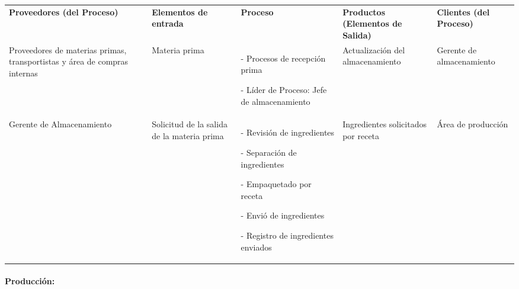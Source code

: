 \documentclass[11pt]{article}
\newcounter{none} %
\begin{document}
{\def\LTcaptype{none} %
\begin{longtable}[]{@{}
  >{\centering\arraybackslash}p{}
  >{\centering\arraybackslash}p{}
  >{\centering\arraybackslash}p{}
  >{\centering\arraybackslash}p{}
  >{\centering\arraybackslash}p{}@{}}
\toprule\noalign{}
\endhead
\bottomrule\noalign{}
\endlastfoot
\textbf{Proveedores (del Proceso)} & \textbf{Elementos de entrada} &
\textbf{Proceso} & \textbf{Productos (Elementos de Salida)} &
\textbf{Clientes (del Proceso)} \\
Proveedores de materias primas, transportistas y área de compras
internas & Materia prima & - Procesos de recepción prima

- Líder de Proceso: Jefe de almacenamiento & Actualización del
almacenamiento & Gerente de almacenamiento \\
Gerente de Almacenamiento & Solicitud de la salida de la materia prima &
- Revisión de ingredientes

- Separación de ingredientes

- Empaquetado por receta

- Envió de ingredientes

- Registro de ingredientes enviados & Ingredientes solicitados por
receta & Área de producción \\
\end{longtable}
}

\paragraph{Producción:}
\end{document}
